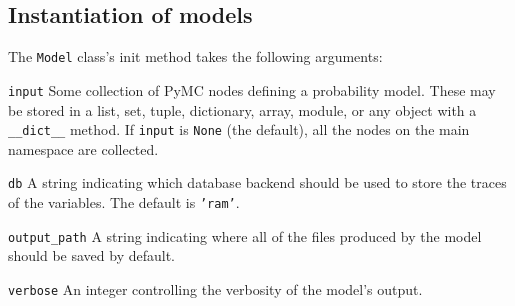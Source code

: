 \subsection{Instantiation of models} \label{sec:ModelInstantiation}
The \texttt{Model} class's init method takes the following arguments:
\begin{description}
    \item \texttt{input} Some collection of PyMC nodes defining a probability model. These may be stored in a list, set, tuple, dictionary, array, module, or any object with a \texttt{\_\_dict\_\_} method. If \texttt{input} is \texttt{None} (the default), all the nodes on the main namespace are collected.
    \item \texttt{db} A string indicating which database backend should be used to store the traces of the variables. The default is \texttt{'ram'}.
    \item \texttt{output\_path} A string indicating where all of the files produced by the model should be saved by default.
    \item \texttt{verbose} An integer controlling the verbosity of the model's output.
\end{description}